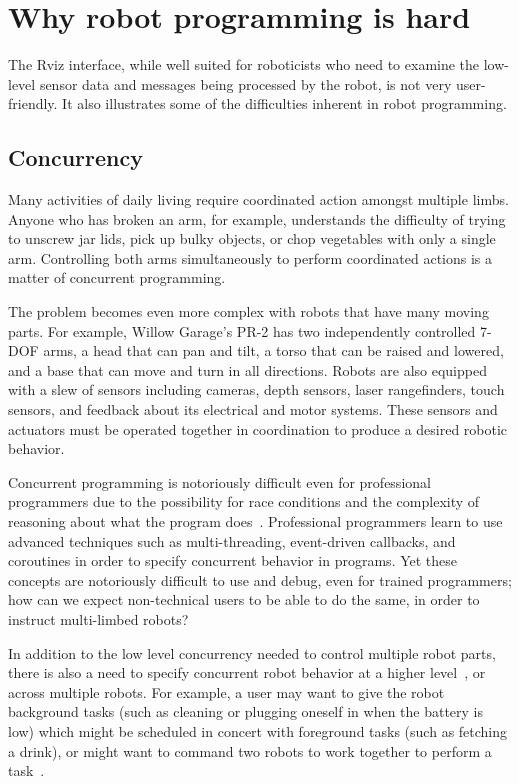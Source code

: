\documentclass[10pt,twocolumn]{article}
\begin{document}
\section{Why robot programming is hard}

The Rviz interface, while well suited for roboticists who need to examine the low-level sensor data and messages being processed by the robot, is not very user-friendly. It also illustrates some of the difficulties inherent in robot programming.

\subsection{Concurrency}


Many activities of daily living require coordinated action amongst multiple limbs. Anyone who has broken an arm, for example, understands the difficulty of trying to unscrew jar lids, pick up bulky objects, or chop vegetables with only a single arm. Controlling both arms simultaneously to perform coordinated actions is a matter of concurrent programming.

The problem becomes even more complex with robots that have many moving parts.  For example, Willow Garage's PR-2 has two independently controlled 7-DOF arms, a head that can pan and tilt, a torso that can be raised and lowered, and a base that can move and turn in all directions. Robots are also equipped with a slew of sensors including cameras, depth sensors, laser rangefinders, touch sensors, and feedback about its electrical and motor systems. These sensors and actuators must be operated together in coordination to produce a desired robotic behavior.

Concurrent programming is notoriously difficult even for professional programmers due to the possibility for race conditions and the complexity of reasoning about what the program does~\cite{shavit-cacm11}. Professional programmers learn to use advanced techniques such as multi-threading, event-driven callbacks, and coroutines in order to specify concurrent behavior in programs. Yet these concepts are notoriously difficult to use and debug, even for trained programmers; how can we expect non-technical users to be able to do the same, in order to instruct multi-limbed robots?

In addition to the low level concurrency needed to control multiple robot parts, there is also a need to specify concurrent robot behavior at a higher level~\cite{cakmak-hri13}, or across multiple robots. For example, a user may want to give the robot background tasks (such as cleaning or plugging oneself in when the battery is low) which might be scheduled in concert with foreground tasks (such as fetching a drink), or might want to command two robots to work together to perform a task~\cite{liu-chi11}.
\end{document}
